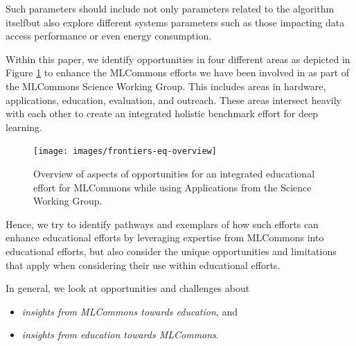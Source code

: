 Such parameters should include not only parameters related to the algorithm itselfbut also explore different systems parameters such as those impacting data access performance or even energy consumption.

Within this paper, we identify opportunities in four different areas as depicted in Figure \ref{fig:opportunities} to enhance the MLCommons efforts we have been involved in as part of the MLCommons Science Working Group. This includes areas in hardware, applications, education, evaluation, and outreach. These areas intersect heavily with each other to create an integrated holistic benchmark effort for deep learning.    


\begin{figure}[htb]
    \centering\texttt{[image: images/frontiers-eq-overview]}
    \caption{Overview of aspects of opportunities for an integrated educational effort for MLCommons while using Applications from the Science Working Group.}
    \label{fig:opportunities}
\end{figure}

Hence, we try to identify pathways and exemplars of how such efforts can enhance educational efforts by leveraging expertise from MLCommons into educational efforts, but also consider the unique opportunities and limitations that apply when considering their use within educational efforts.

In general, we look at opportunities and challenges about 

\begin{itemize}
\item {\em insights from MLCommons towards education}, and 
\item {\em insights from education towards MLCommons}.
\end{itemize}



